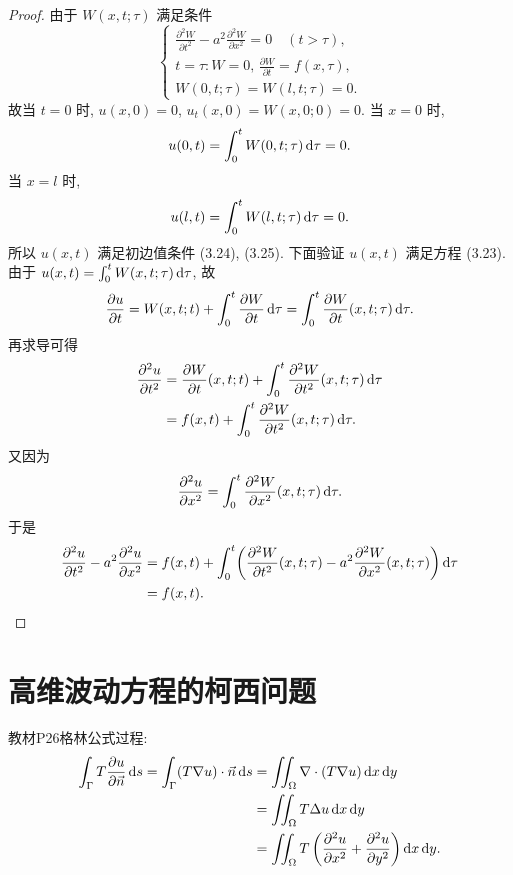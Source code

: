 \begin{proof}
  由于 $W(x,t;\tau)$ 满足条件
  \[\begin{cases}
    \frac{\partial^2W}{\partial t^2} - a^2 \frac{\partial^2W}{\partial x^2} = 0\quad (t>\tau), \\
    t = \tau: W=0,\,\frac{\partial W}{\partial t} = f(x,\tau), \\
    W(0,t;\tau) = W(l,t;\tau) = 0.
  \end{cases}\]
  故当 $t=0$ 时, $u(x,0) = 0$, $u_t(x,0) = W(x,0;0) = 0$.
  当 $x=0$ 时,
  \[u(0, t) = \int_0^t W(0,t;\tau)\mathop{}\!\mathrm{d}\tau = 0.\]
  当 $x=l$ 时,
  \[u(l, t) = \int_0^t W(l,t;\tau)\mathop{}\!\mathrm{d}\tau = 0.\]
  所以 $u(x,t)$ 满足初边值条件 (3.24), (3.25). 下面验证 $u(x,t)$ 满足方程 (3.23).
  由于 $u(x,t) = \int_0^t W(x,t;\tau)\mathop{}\!\mathrm{d}\tau$, 故
  \[\frac{\partial u}{\partial t} = W(x,t;t) + \int_0^t \frac{\partial W}{\partial t}\mathop{}\!\mathrm{d}\tau
    = \int_0^t \frac{\partial W}{\partial t}(x,t;\tau)\mathop{}\!\mathrm{d}\tau.\]
  再求导可得
  \begin{align*}
    \frac{\partial^2u}{\partial t^2}
    & = \frac{\partial W}{\partial t}(x,t;t)
      + \int_0^t \frac{\partial^2W}{\partial t^2}(x,t;\tau)\mathop{}\!\mathrm{d}\tau \\
    & = f(x,t) + \int_0^t \frac{\partial^2W}{\partial t^2}(x,t;\tau)\mathop{}\!\mathrm{d}\tau.
  \end{align*}
  又因为
  \[\frac{\partial^2u}{\partial x^2} 
    = \int_0^t \frac{\partial^2W}{\partial x^2}(x,t;\tau)\mathop{}\!\mathrm{d}\tau.\]
  于是
  \begin{align*}
    \frac{\partial^2u}{\partial t^2} - a^2 \frac{\partial^2u}{\partial x^2}
    & = f(x,t) + \int_0^t \biggl(\frac{\partial ^2W}{\partial t^2}(x,t;\tau)
      - a^2 \frac{\partial^2W}{\partial x^2}(x,t;\tau)\biggr)\mathop{}\!\mathrm{d}\tau \\
    & = f(x,t).\qedhere
  \end{align*}
\end{proof}


\section{高维波动方程的柯西问题}

教材P26格林公式过程:
\begin{align*}
  \int_{\Gamma}T\frac{\partial u}{\partial\vec{n}}\diff s
  = \int_{\Gamma}(T\nabla u)\cdot\vec{n}\diff s
  & = \iint_{\Omega}\nabla\cdot(T\nabla u)\diff x\diff y \\
  & = \iint_{\Omega}T\Delta u\diff x\diff y \\
  & = \iint_{\Omega}T\left(\frac{\partial^2u}{\partial x^2}
    + \frac{\partial^2u}{\partial y^2}\right)\diff x\diff y.
\end{align*}

